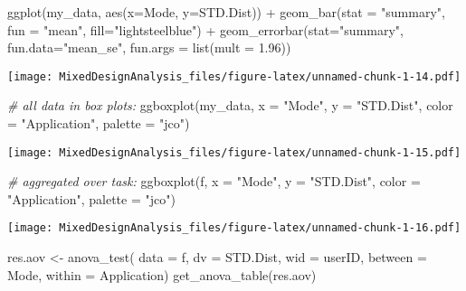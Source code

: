 \documentclass[
]{article}
\newenvironment{Shaded}{\begin{snugshade}}{\end{snugshade}}
\newcommand{\AttributeTok}[1]{\textcolor[rgb]{0.77,0.63,0.00}{#1}}
\newcommand{\CommentTok}[1]{\textcolor[rgb]{0.56,0.35,0.01}{\textit{#1}}}
\newcommand{\FloatTok}[1]{\textcolor[rgb]{0.00,0.00,0.81}{#1}}
\newcommand{\FunctionTok}[1]{\textcolor[rgb]{0.00,0.00,0.00}{#1}}
\newcommand{\NormalTok}[1]{#1}
\newcommand{\OtherTok}[1]{\textcolor[rgb]{0.56,0.35,0.01}{#1}}
\newcommand{\SpecialCharTok}[1]{\textcolor[rgb]{0.00,0.00,0.00}{#1}}
\newcommand{\StringTok}[1]{\textcolor[rgb]{0.31,0.60,0.02}{#1}}
\begin{document}
\begin{Shaded}
\begin{Highlighting}[]
\FunctionTok{ggplot}\NormalTok{(my\_data, }\FunctionTok{aes}\NormalTok{(}\AttributeTok{x=}\NormalTok{Mode, }\AttributeTok{y=}\NormalTok{STD.Dist)) }\SpecialCharTok{+} \FunctionTok{geom\_bar}\NormalTok{(}\AttributeTok{stat =} \StringTok{"summary"}\NormalTok{, }\AttributeTok{fun =} \StringTok{"mean"}\NormalTok{, }\AttributeTok{fill=}\StringTok{"lightsteelblue"}\NormalTok{) }\SpecialCharTok{+} \FunctionTok{geom\_errorbar}\NormalTok{(}\AttributeTok{stat=}\StringTok{"summary"}\NormalTok{, }\AttributeTok{fun.data=}\StringTok{"mean\_se"}\NormalTok{, }\AttributeTok{fun.args =} \FunctionTok{list}\NormalTok{(}\AttributeTok{mult =} \FloatTok{1.96}\NormalTok{))}
\end{Highlighting}
\end{Shaded}

\texttt{[image: MixedDesignAnalysis\_files/figure-latex/unnamed-chunk-1-14.pdf]}

\begin{Shaded}
\begin{Highlighting}[]
\CommentTok{\# all data in box plots: }
\FunctionTok{ggboxplot}\NormalTok{(my\_data, }\AttributeTok{x =} \StringTok{"Mode"}\NormalTok{, }\AttributeTok{y =} \StringTok{"STD.Dist"}\NormalTok{, }\AttributeTok{color =} \StringTok{"Application"}\NormalTok{, }\AttributeTok{palette =} \StringTok{"jco"}\NormalTok{)}
\end{Highlighting}
\end{Shaded}

\texttt{[image: MixedDesignAnalysis\_files/figure-latex/unnamed-chunk-1-15.pdf]}

\begin{Shaded}
\begin{Highlighting}[]
\CommentTok{\# aggregated over task: }
\FunctionTok{ggboxplot}\NormalTok{(f, }\AttributeTok{x =} \StringTok{"Mode"}\NormalTok{, }\AttributeTok{y =} \StringTok{"STD.Dist"}\NormalTok{, }\AttributeTok{color =} \StringTok{"Application"}\NormalTok{, }\AttributeTok{palette =} \StringTok{"jco"}\NormalTok{)}
\end{Highlighting}
\end{Shaded}

\texttt{[image: MixedDesignAnalysis\_files/figure-latex/unnamed-chunk-1-16.pdf]}

\begin{Shaded}
\begin{Highlighting}[]
\NormalTok{res.aov }\OtherTok{\textless{}{-}} \FunctionTok{anova\_test}\NormalTok{( }\AttributeTok{data =}\NormalTok{ f, }\AttributeTok{dv =}\NormalTok{ STD.Dist, }\AttributeTok{wid =}\NormalTok{ userID, }\AttributeTok{between =}\NormalTok{ Mode, }\AttributeTok{within =}\NormalTok{ Application)}
\FunctionTok{get\_anova\_table}\NormalTok{(res.aov)}
\end{Highlighting}
\end{Shaded}
\end{document}
